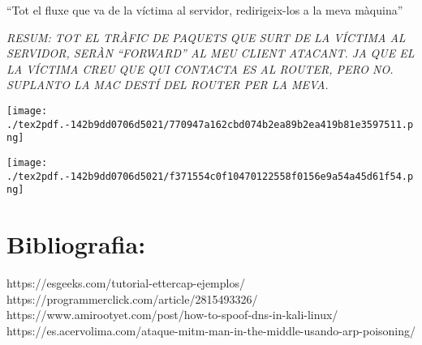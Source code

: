 \documentclass[]{article}
\begin{document}
``Tot el fluxe que va de la víctima al servidor, redirigeix-los a la
meva màquina''

\emph{RESUM: TOT EL TRÀFIC DE PAQUETS QUE SURT DE LA VÍCTIMA AL
SERVIDOR, SERÀN ``FORWARD'' AL MEU CLIENT ATACANT. JA QUE EL LA VÍCTIMA
CREU QUE QUI CONTACTA ES AL ROUTER, PERO NO. SUPLANTO LA MAC DESTÍ DEL
ROUTER PER LA MEVA.}

\texttt{[image: ./tex2pdf.-142b9dd0706d5021/770947a162cbd074b2ea89b2ea419b81e3597511.png]}

\texttt{[image: ./tex2pdf.-142b9dd0706d5021/f371554c0f10470122558f0156e9a54a45d61f54.png]}

\hypertarget{bibliografia}{%
\section{\texorpdfstring{\textbf{Bibliografia}:}{Bibliografia:}}\label{bibliografia}}

https://esgeeks.com/tutorial-ettercap-ejemplos/
https://programmerclick.com/article/2815493326/
https://www.amirootyet.com/post/how-to-spoof-dns-in-kali-linux/
https://es.acervolima.com/ataque-mitm-man-in-the-middle-usando-arp-poisoning/
\end{document}
